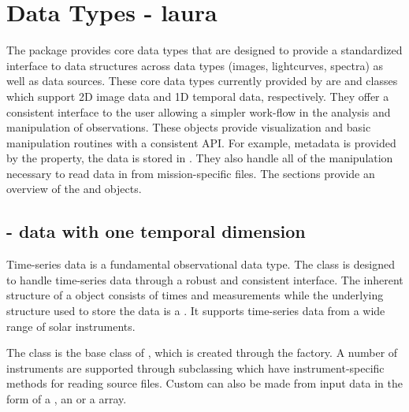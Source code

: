 \section{Data Types - laura}
\label{sec:data_types}
The \sunpypkg package provides core data types that are designed to provide a standardized interface to data structures across data types (images, lightcurves, spectra) as well as data sources. 
These core data types currently provided by \sunpypkg are \Map and \Timeseries classes which support 2D image data and 1D temporal data, respectively. 
They offer a consistent interface to the user allowing a simpler work-flow in the analysis and manipulation of observations. 
These objects provide visualization and basic manipulation routines with a consistent API. 
For example, metadata is provided by the  property, the data is stored in . 
They also handle all of the manipulation necessary to read data in from mission-specific files. 
The sections provide an overview of the \Timeseries and \Map objects. 

\subsection{\Timeseries - data with one temporal dimension}
\label{sec:timeseries}
Time-series data is a fundamental observational data type. 
The \Timeseries class is designed to handle time-series data through a robust and consistent interface. 
The inherent structure of a \Timeseries object consists of times and measurements while the underlying structure used to store the data is a . 
It supports time-series data from a wide range of solar instruments. 

The \GenericTimeSeries class is the base class of \Timeseries, which is created through the \Timeseries factory. 
A number of instruments are supported through subclassing which have instrument-specific methods for reading source files. 
Custom \Timeseries can also be made from input data in the form of a , an  or a  array. 

